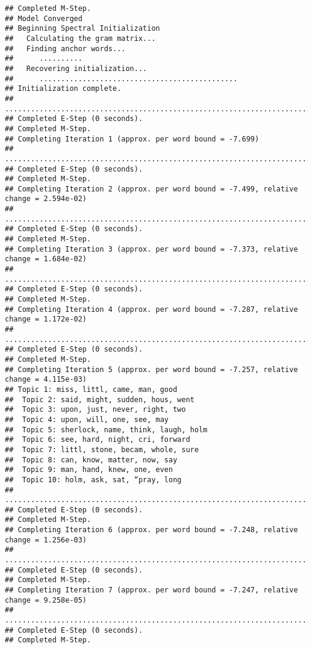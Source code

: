 \documentclass[
]{book}
\begin{document}
\begin{verbatim}
## Completed M-Step. 
## Model Converged 
## Beginning Spectral Initialization 
##   Calculating the gram matrix...
##   Finding anchor words...
##      ..........
##   Recovering initialization...
##      ..............................................
## Initialization complete.
## ....................................................................................................
## Completed E-Step (0 seconds). 
## Completed M-Step. 
## Completing Iteration 1 (approx. per word bound = -7.699) 
## ....................................................................................................
## Completed E-Step (0 seconds). 
## Completed M-Step. 
## Completing Iteration 2 (approx. per word bound = -7.499, relative change = 2.594e-02) 
## ....................................................................................................
## Completed E-Step (0 seconds). 
## Completed M-Step. 
## Completing Iteration 3 (approx. per word bound = -7.373, relative change = 1.684e-02) 
## ....................................................................................................
## Completed E-Step (0 seconds). 
## Completed M-Step. 
## Completing Iteration 4 (approx. per word bound = -7.287, relative change = 1.172e-02) 
## ....................................................................................................
## Completed E-Step (0 seconds). 
## Completed M-Step. 
## Completing Iteration 5 (approx. per word bound = -7.257, relative change = 4.115e-03) 
## Topic 1: miss, littl, came, man, good 
##  Topic 2: said, might, sudden, hous, went 
##  Topic 3: upon, just, never, right, two 
##  Topic 4: upon, will, one, see, may 
##  Topic 5: sherlock, name, think, laugh, holm 
##  Topic 6: see, hard, night, cri, forward 
##  Topic 7: littl, stone, becam, whole, sure 
##  Topic 8: can, know, matter, now, say 
##  Topic 9: man, hand, knew, one, even 
##  Topic 10: holm, ask, sat, “pray, long 
## ....................................................................................................
## Completed E-Step (0 seconds). 
## Completed M-Step. 
## Completing Iteration 6 (approx. per word bound = -7.248, relative change = 1.256e-03) 
## ....................................................................................................
## Completed E-Step (0 seconds). 
## Completed M-Step. 
## Completing Iteration 7 (approx. per word bound = -7.247, relative change = 9.258e-05) 
## ....................................................................................................
## Completed E-Step (0 seconds). 
## Completed M-Step. 

\end{verbatim}
\end{document}
